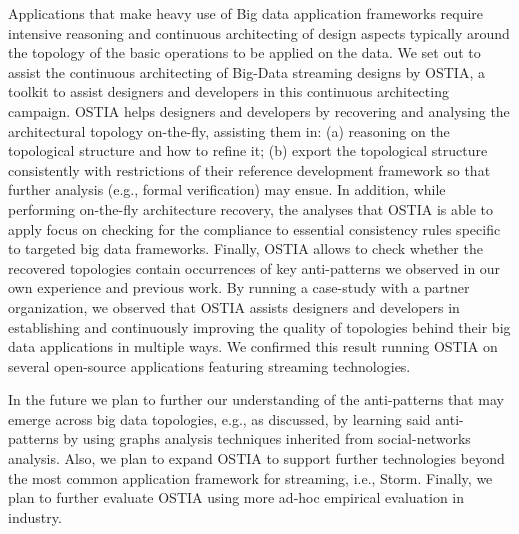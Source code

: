 Applications that make heavy use of Big data application frameworks require intensive reasoning and continuous architecting of design aspects typically around the topology of the basic operations to be applied on the data. We set out to assist the continuous architecting of Big-Data streaming designs by OSTIA, a toolkit to assist designers and developers in this continuous architecting campaign. OSTIA helps designers and developers by recovering and analysing the architectural topology on-the-fly, assisting them in: (a) reasoning on the topological structure and how to refine it; (b) export the topological structure consistently with restrictions of their reference development framework so that further analysis (e.g., formal verification) may ensue. In addition, while performing on-the-fly architecture recovery, the analyses that OSTIA is able to apply focus on checking for the compliance to essential consistency rules specific to targeted big data frameworks. Finally, OSTIA allows to check whether the recovered topologies contain occurrences of key anti-patterns we observed in our own experience and previous work. By running a case-study with a partner organization, we observed that OSTIA assists designers and developers in establishing and continuously improving the quality of topologies behind their big data applications in multiple ways. We confirmed this result running OSTIA on several open-source applications featuring streaming technologies.
 
In the future we plan to further our understanding of the anti-patterns that may emerge across big data topologies, e.g., as discussed, by learning said anti-patterns by using graphs analysis techniques inherited from social-networks analysis. Also, we plan to expand OSTIA to support further technologies beyond the most common application framework for streaming, i.e., Storm. Finally, we plan to further evaluate OSTIA using more ad-hoc empirical evaluation in industry.